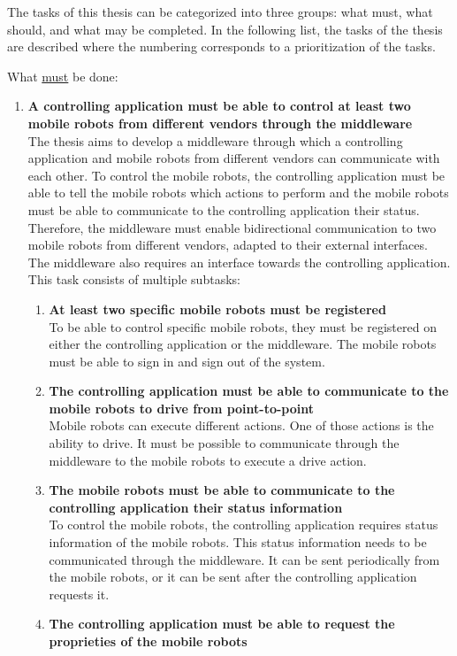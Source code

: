 The tasks of this thesis can be categorized into three groups: what must, what should, and what may be completed. In the following list, the tasks of the thesis are described where the numbering corresponds to a prioritization of the tasks.

What \underline{must} be done:
\begin{enumerate}
   \item \textbf{A controlling application must be able to control at least two mobile robots from different vendors through the middleware} \hfill \\
	The thesis aims to develop a middleware through which a controlling application and mobile robots from different vendors can communicate with each other. To control the mobile robots, the controlling application must be able to tell the mobile robots which actions to perform and the mobile robots must be able to communicate to the controlling application their status. Therefore, the middleware must enable bidirectional communication to two mobile robots from different vendors, adapted to their external interfaces. The middleware also requires an interface towards the controlling application. This task consists of multiple subtasks:
   \begin{enumerate}
     \item\textbf{At least two specific mobile robots must be registered} \hfill \\
To be able to control specific mobile robots, they must be registered on either the controlling application or the middleware. The mobile robots must be able to sign in and sign out of the system.
     \item\textbf{The controlling application must be able to communicate to the mobile robots to drive from point-to-point} \hfill \\
Mobile robots can execute different actions. One of those actions is the ability to drive. It must be possible to communicate through the middleware to the mobile robots to execute a drive action.
     \item\textbf{The mobile robots must be able to communicate to the controlling application their status information} \hfill \\
To control the mobile robots,  the controlling application requires status information of the mobile robots. This status information needs to be communicated through the middleware. It can be sent periodically from the mobile robots, or it can be sent after  the controlling application requests it.
     \item\textbf{The controlling application must be able to request the proprieties of the mobile robots} \hfill \\

\end{enumerate}
\end{enumerate}
